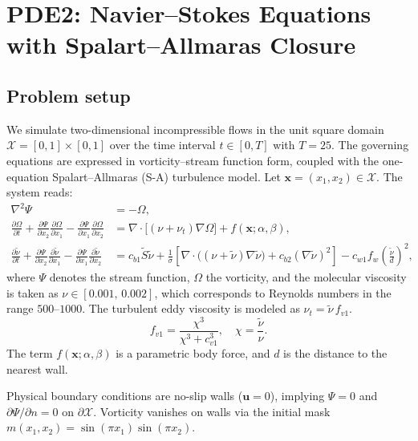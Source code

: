 \section{PDE2: Navier--Stokes Equations with Spalart--Allmaras Closure}
\label{sec:NSE-SA}

\renewcommand{\thefigure}{D.\arabic{figure}}  %
\renewcommand{\thetable}{D.\arabic{table}}  %


\subsection*{Problem setup}
We simulate two-dimensional incompressible flows in the unit square domain \( \mathcal{X} = [0, 1] \times [0, 1] \) over the time interval \( t \in [0, T] \) with \( T = 25 \). The governing equations are expressed in vorticity--stream function form, coupled with the one-equation Spalart--Allmaras (S-A) turbulence model. Let \( \mathbf{x} = (x_1, x_2) \in \mathcal{X} \). The system reads:
\begin{align}
\nabla^2 \Psi &= -\Omega, \label{eq:streamfunction} \\[4pt]
\frac{\partial \Omega}{\partial t}
+ \frac{\partial \Psi}{\partial x_2} \frac{\partial \Omega}{\partial x_1}
- \frac{\partial \Psi}{\partial x_1} \frac{\partial \Omega}{\partial x_2}
&= \nabla \cdot \bigl[ (\nu + \nu_t) \nabla \Omega \bigr] + f(\mathbf{x}; \alpha, \beta), \label{eq:vorticity} \\[6pt]
\frac{\partial \tilde{\nu}}{\partial t}
+ \frac{\partial \Psi}{\partial x_2} \frac{\partial \tilde{\nu}}{\partial x_1}
- \frac{\partial \Psi}{\partial x_1} \frac{\partial \tilde{\nu}}{\partial x_2}
&= c_{b1} \tilde{S} \tilde{\nu}
+ \frac{1}{\sigma} \left[ \nabla \cdot \bigl( (\nu + \tilde{\nu}) \nabla \tilde{\nu} \bigr) + c_{b2} (\nabla \tilde{\nu})^2 \right]
- c_{w1} f_w \left( \frac{\tilde{\nu}}{d} \right)^2, \label{eq:SA}
\end{align}
where $\Psi$ denotes the stream function, $\Omega$ the vorticity, and the molecular viscosity is taken as $\nu \in [0.001,\,0.002]$, which corresponds to Reynolds numbers in the range $500$--$1000$. The turbulent eddy viscosity is modeled as $\nu_t = \tilde{\nu}\, f_{v1}$.
\[
f_{v1} = \frac{\chi^3}{\chi^3 + c_{v1}^3}, \quad \chi = \frac{\tilde{\nu}}{\nu}.
\]
The term \( f(\mathbf{x}; \alpha, \beta) \) is a parametric body force, and \( d \) is the distance to the nearest wall.

Physical boundary conditions are no-slip walls (\( \mathbf{u} = 0 \)), implying \( \Psi = 0 \) and \( \partial \Psi / \partial n = 0 \) on \( \partial \mathcal{X} \). Vorticity vanishes on walls via the initial mask \( m(x_1, x_2) = \sin(\pi x_1) \sin(\pi x_2) \).

